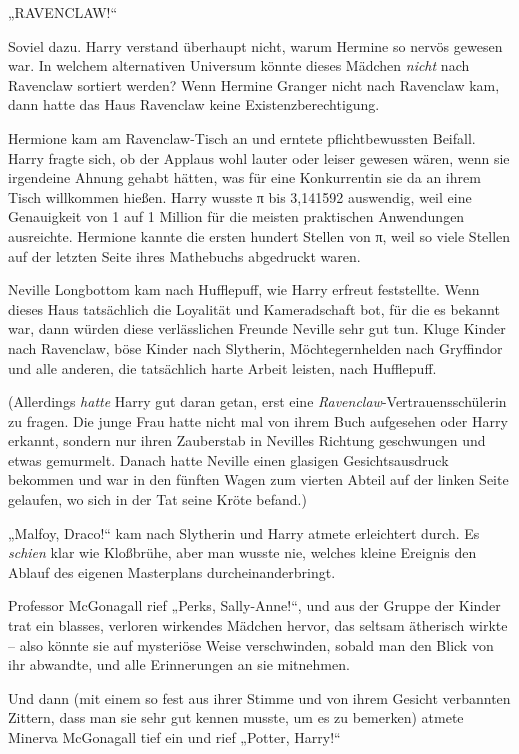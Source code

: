 {„RAVENCLAW!“

Soviel dazu. Harry verstand überhaupt nicht, warum Hermine so nervös gewesen war. In welchem alternativen Universum könnte dieses Mädchen \emph{nicht} nach Ravenclaw sortiert werden? Wenn Hermine Granger nicht nach Ravenclaw kam, dann hatte das Haus Ravenclaw keine Existenzberechtigung.

Hermione kam am Ravenclaw-Tisch an und erntete pflichtbewussten Beifall. Harry fragte sich, ob der Applaus wohl lauter oder leiser gewesen wären, wenn sie irgendeine Ahnung gehabt hätten, was für eine Konkurrentin sie da an ihrem Tisch willkommen hießen. Harry wusste π bis 3,141592 auswendig, weil eine Genauigkeit von 1 auf 1 Million für die meisten praktischen Anwendungen ausreichte. Hermione kannte die ersten hundert Stellen von π, weil so viele Stellen auf der letzten Seite ihres Mathebuchs abgedruckt waren.

Neville Longbottom kam nach Hufflepuff, wie Harry erfreut feststellte. Wenn dieses Haus tatsächlich die Loyalität und Kameradschaft bot, für die es bekannt war, dann würden diese verlässlichen Freunde Neville sehr gut tun. Kluge Kinder nach Ravenclaw, böse Kinder nach Slytherin, Möchtegernhelden nach Gryffindor und alle anderen, die tatsächlich harte Arbeit leisten, nach Hufflepuff.

(Allerdings \emph{hatte} Harry gut daran getan, erst eine \emph{Ravenclaw}-Vertrauensschülerin zu fragen. Die junge Frau hatte nicht mal von ihrem Buch aufgesehen oder Harry erkannt, sondern nur ihren Zauberstab in Nevilles Richtung geschwungen und etwas gemurmelt. Danach hatte Neville einen glasigen Gesichtsausdruck bekommen und war in den fünften Wagen zum vierten Abteil auf der linken Seite gelaufen, wo sich in der Tat seine Kröte befand.)

„Malfoy, Draco!“ kam nach Slytherin und Harry atmete erleichtert durch. Es \emph{schien} klar wie Kloßbrühe, aber man wusste nie, welches kleine Ereignis den Ablauf des eigenen Masterplans durcheinanderbringt.

Professor McGonagall rief „Perks, Sally-Anne!“, und aus der Gruppe der Kinder trat ein blasses, verloren wirkendes Mädchen hervor, das seltsam ätherisch wirkte -- also könnte sie auf mysteriöse Weise verschwinden, sobald man den Blick von ihr abwandte, und alle Erinnerungen an sie mitnehmen.

Und dann (mit einem so fest aus ihrer Stimme und von ihrem Gesicht verbannten Zittern, dass man sie sehr gut kennen musste, um es zu bemerken) atmete Minerva McGonagall tief ein und rief „Potter, Harry!“

}
